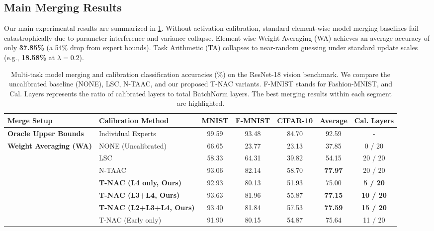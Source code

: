 \documentclass{article}
\theoremstyle{plain}
\theoremstyle{definition}
\begin{document}
\subsection{Main Merging Results}
Our main experimental results are summarized in \cref{tab:main_results}. Without activation calibration, standard element-wise model merging baselines fail catastrophically due to parameter interference and variance collapse. Element-wise Weight Averaging (WA) achieves an average accuracy of only \textbf{37.85\%} (a 54\% drop from expert bounds). Task Arithmetic (TA) collapses to near-random guessing under standard update scales (e.g., \textbf{18.58\%} at $\lambda=0.2$).

\begin{table}[t]
\caption{Multi-task model merging and calibration classification accuracies (\%) on the ResNet-18 vision benchmark. We compare the uncalibrated baseline (NONE), LSC, N-TAAC, and our proposed T-NAC variants. F-MNIST stands for Fashion-MNIST, and Cal. Layers represents the ratio of calibrated layers to total BatchNorm layers. The best merging results within each segment are highlighted.}
\label{tab:main_results}
\begin{center}
\begin{scriptsize}
\renewcommand{\arraystretch}{0.9}
\setlength{\tabcolsep}{3.0pt}
\begin{tabular}{llccccc}
\toprule
\textbf{Merge Setup} & \textbf{Calibration Method} & \textbf{MNIST} & \textbf{F-MNIST} & \textbf{CIFAR-10} & \textbf{Average} & \textbf{Cal. Layers} \\
\midrule
\textbf{Oracle Upper Bounds} & Individual Experts & 99.59 & 93.48 & 84.70 & 92.59 & - \\
\midrule
\textbf{Weight Averaging (WA)} & NONE (Uncalibrated) & 66.65 & 23.77 & 23.13 & 37.85 & 0 / 20 \\
& LSC & 58.33 & 64.31 & 39.82 & 54.15 & 20 / 20 \\
& N-TAAC & 93.06 & 82.14 & 58.70 & \textbf{77.97} & 20 / 20 \\
& \textbf{T-NAC (L4 only, Ours)} & 92.93 & 80.13 & 51.93 & 75.00 & \textbf{5 / 20} \\
& \textbf{T-NAC (L3+L4, Ours)} & 93.63 & 81.96 & 55.87 & \textbf{77.15} & \textbf{10 / 20} \\
& \textbf{T-NAC (L2+L3+L4, Ours)} & 93.40 & 81.84 & 57.53 & \textbf{77.59} & \textbf{15 / 20} \\
& T-NAC (Early only) & 91.90 & 80.15 & 54.87 & 75.64 & 11 / 20 \\

\end{tabular}
\end{scriptsize}
\end{center}
\end{table}
\end{document}
